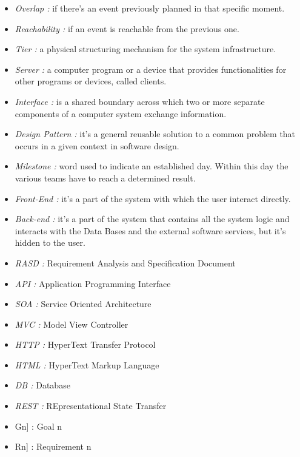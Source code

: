 \newpage
{}
\begin{itemize}
	\item \emph{Overlap :} if there’s an event previously planned in that specific moment.
	\item \emph{Reachability :} if an event is reachable from the previous one.
	\item \emph{Tier :} a physical structuring mechanism for the system infrastructure.
	\item \emph{Server :} a computer program or a device that provides functionalities for other programs or devices, called clients.
	\item \emph{Interface :} is a shared boundary across which two or more separate components of a computer system exchange information.
	\item \emph{Design Pattern :} it's a general reusable solution to a common problem that occurs in a given context in software design.
	\item \emph{Milestone :} word used to indicate an established day. Within this day the various teams have to reach a determined result.
	\item \emph{Front-End :} it's a part of the system with which the user interact directly.
	\item \emph{Back-end :} it's a part of the system that contains all the system logic and interacts with the Data Bases and the external software services, but it's hidden to the user.
\end{itemize}

\begin{itemize}
	\setlength{\leftskip}{0.5cm}
	\item \emph{RASD :} Requirement Analysis and Specification Document
	\item \emph{API :} Application Programming Interface
	\item \emph{SOA :} Service Oriented Architecture
	\item \emph{MVC :} Model View Controller
	\item \emph{HTTP :} HyperText Transfer Protocol
	\item \emph{HTML :} HyperText Markup Language
	\item \emph{DB :} Database
	\item \emph{REST :} REpresentational State Transfer
\end{itemize}

\begin{itemize}
	\setlength{\leftskip}{0.5cm}
	\item \lbrack Gn] : Goal n
	\item \lbrack Rn] : Requirement n
\end{itemize}


